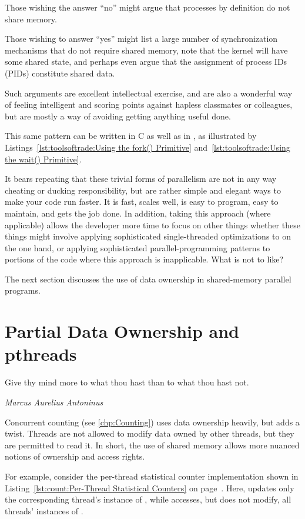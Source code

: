 {{	Those wishing the answer ``no'' might argue that processes by
	definition do not share memory.

	Those wishing to answer ``yes'' might list a large number of
	synchronization mechanisms that do not require shared memory,
	note that the kernel will have some shared state, and perhaps
	even argue that the assignment of process IDs (PIDs) constitute
	shared data.

	Such arguments are excellent intellectual exercise, and are
	also a wonderful way of feeling intelligent and scoring points
	against hapless classmates or colleagues, but are mostly a way
	of avoiding getting anything useful done.
}\QuickQuizEndE
}

This same pattern can be written in C as well as in , as illustrated by
Listings~\ref{lst:toolsoftrade:Using the fork() Primitive}
and~\ref{lst:toolsoftrade:Using the wait() Primitive}.

It bears repeating that these trivial forms of parallelism are not in
any way cheating or ducking responsibility, but are rather simple and
elegant ways to make your code run faster.
It is fast, scales well, is easy to program, easy to maintain, and
gets the job done.
In addition, taking this approach (where applicable) allows the developer
more time to focus on other things whether these things might involve
applying sophisticated single-threaded optimizations to 
on the one hand, or applying sophisticated parallel-programming patterns
to portions of the code where this approach is inapplicable.
What is not to like?

The next section discusses the use of data ownership in shared-memory
parallel programs.

\section{Partial Data Ownership and pthreads}
\label{sec:owned:Partial Data Ownership and pthreads}
%
\epigraph{Give thy mind more to what thou hast than to what thou hast not.}
	 {\emph{Marcus Aurelius Antoninus}}

Concurrent counting (see \cref{chp:Counting}) uses data ownership heavily,
but adds a twist.
Threads are not allowed to modify data owned by other threads,
but they are permitted to read it.
In short, the use of shared memory allows more nuanced notions
of ownership and access rights.

For example, consider the per-thread statistical counter implementation
shown in
Listing~\ref{lst:count:Per-Thread Statistical Counters} on
page~\pageref{lst:count:Per-Thread Statistical Counters}.
Here,  updates only the corresponding thread's
instance of ,
while  accesses, but does not modify, all
threads' instances of .

